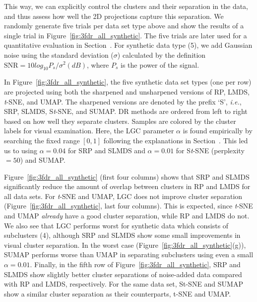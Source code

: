\documentclass[sagev,Afour,times]{sagej}
\begin{document}
This way, we can explicitly control the clusters and their separation in the data, and thus assess how well the 2D projections capture this separation. We randomly generate five trials per data set type above and show the results of a single trial in Figure~\ref{fig:3fdr_all_synthetic}. The five trials are later used for a quantitative evaluation in Section~. For synthetic data type (5), we add Gaussian noise using the standard deviation ($\sigma$) calculated by the definition $\mbox{SNR}=10 log_{10}{P_s/\sigma^2} (dB)$, where $P_s$ is the power of the signal.

In Figure~\ref{fig:3fdr_all_synthetic}, the five synthetic data set types (one per row) are projected using both the sharpened and unsharpened versions of RP, LMDS, \emph{t}-SNE, and UMAP. The sharpened versions are denoted by the prefix `S', \emph{i.e.}, SRP, SLMDS, S\emph{t}-SNE, and SUMAP. DR methods are ordered from left to right based on how well they separate clusters. Samples are colored by the cluster labels for visual examination. Here, the LGC parameter $\alpha$ is found empirically by searching the fixed range $[0,1]$ following the explanations in Section~. This led us to using $\alpha=0.04$ for SRP and SLMDS and $\alpha=0.01$ for S\emph{t}-SNE (perplexity$=50$) and SUMAP.

Figure~\ref{fig:3fdr_all_synthetic} (first four columns) shows that SRP and SLMDS significantly reduce the amount of overlap between clusters in RP and LMDS for all data sets. For \emph{t}-SNE and UMAP, LGC does not improve cluster separation (Figure~\ref{fig:3fdr_all_synthetic}, last four columns). This is expected, since \emph{t}-SNE and UMAP \emph{already} have a good cluster separation, while RP and LMDS do not. We also see that LGC performs worst for synthetic data which consists of subclusters (4), although SRP and SLMDS show some small improvements in visual cluster separation. In the worst case (Figure~\ref{fig:3fdr_all_synthetic}(g)), SUMAP performs worse than UMAP in separating subclusters using even a small $\alpha=0.01$. Finally, in the fifth row of Figure~\ref{fig:3fdr_all_synthetic}, SRP and SLMDS show slightly better cluster separations of noise-added data compared with RP and LMDS, respectively. For the same data set, St-SNE and SUMAP show a similar cluster separation as their counterparts, t-SNE and UMAP.

\end{document}
